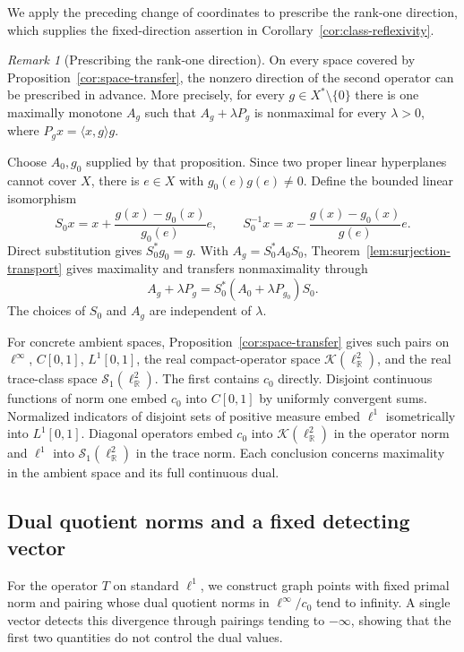 \documentclass[11pt]{article}
\newcommand{\R}{\mathbb R}
\newcommand{\pair}[2]{\langle #1,#2\rangle}
\theoremstyle{definition}
\theoremstyle{remark}
\newtheorem{remark}{Remark}
\begin{document}
We apply the preceding change of coordinates to prescribe the rank-one direction, which supplies the fixed-direction assertion in Corollary~\ref{cor:class-reflexivity}.

\begin{remark}[Prescribing the rank-one direction]
\label{rem:prescribed-direction}
On every space covered by Proposition~\ref{cor:space-transfer}, the nonzero direction of the second operator can be prescribed in advance. More precisely, for every $g\in X^*\setminus\{0\}$ there is one maximally monotone $A_g$ such that $A_g+\lambda P_g$ is nonmaximal for every $\lambda>0$, where $P_gx=\pair{x}{g}g$.

Choose $A_0,g_0$ supplied by that proposition. Since two proper linear hyperplanes cannot cover $X$, there is $e\in X$ with $g_0(e)g(e)\ne0$. Define the bounded linear isomorphism
\[
S_0x=x+\frac{g(x)-g_0(x)}{g_0(e)}e,\qquad
S_0^{-1}x=x-\frac{g(x)-g_0(x)}{g(e)}e.
\]
Direct substitution gives $S_0^*g_0=g$. With $A_g=S_0^*A_0S_0$, Theorem~\ref{lem:surjection-transport} gives maximality and transfers nonmaximality through
\[
A_g+\lambda P_g=S_0^*(A_0+\lambda P_{g_0})S_0.
\]
The choices of $S_0$ and $A_g$ are independent of $\lambda$.
\end{remark}


For concrete ambient spaces, Proposition~\ref{cor:space-transfer} gives such pairs on $\ell^\infty$, $C[0,1]$, $L^1[0,1]$, the real compact-operator space $\mathcal K(\ell^2_{\R})$, and the real trace-class space $\mathcal S_1(\ell^2_{\R})$. The first contains $c_0$ directly. Disjoint continuous functions of norm one embed $c_0$ into $C[0,1]$ by uniformly convergent sums. Normalized indicators of disjoint sets of positive measure embed $\ell^1$ isometrically into $L^1[0,1]$. Diagonal operators embed $c_0$ into $\mathcal K(\ell^2_{\R})$ in the operator norm and $\ell^1$ into $\mathcal S_1(\ell^2_{\R})$ in the trace norm. Each conclusion concerns maximality in the ambient space and its full continuous dual.

\subsection{Dual quotient norms and a fixed detecting vector}
\label{subsec:appendix-dual-quotient}

For the operator $T$ on standard $\ell^1$, we construct graph points with fixed primal norm and pairing whose dual quotient norms in $\ell^\infty/c_0$ tend to infinity. A single vector detects this divergence through pairings tending to $-\infty$, showing that the first two quantities do not control the dual values.
\end{document}

